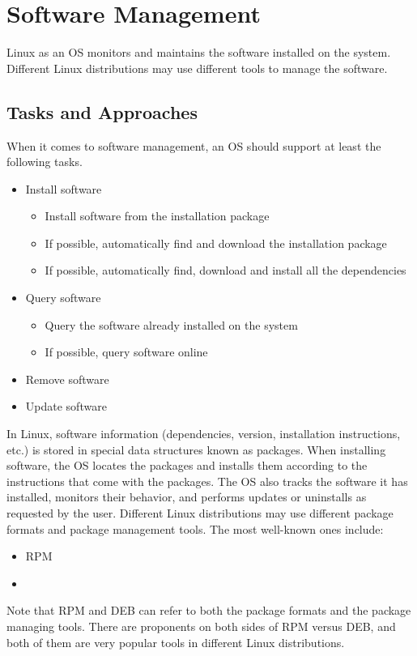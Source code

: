 \chapter{Software Management} \label{ch:software-management}

Linux as an OS monitors and maintains the software installed on the system. Different Linux distributions may use different tools to manage the software.

\section{Tasks and Approaches}

When it comes to software management, an OS should support at least the following tasks.
\begin{itemize}
	\item Install software
		\begin{itemize}
			\item Install software from the installation package
			\item If possible, automatically find and download the installation package
			\item If possible, automatically find, download and install all the dependencies
		\end{itemize}
	\item Query software
		\begin{itemize}
			\item Query the software already installed on the system
			\item If possible, query software online
		\end{itemize}
	\item Remove software
	\item Update software
\end{itemize}

In Linux, software information (dependencies, version, installation instructions, etc.) is stored in special data structures known as packages. When installing software, the OS locates the packages and installs them according to the instructions that come with the packages. The OS also tracks the software it has installed, monitors their behavior, and performs updates or uninstalls as requested by the user. Different Linux distributions may use different package formats and package management tools. The most well-known ones include:
\begin{itemize}
	\item RPM
	\item {}
\end{itemize}
Note that RPM and DEB can refer to both the package formats and the package managing tools. There are proponents on both sides of RPM versus DEB, and both of them are very popular tools in different Linux distributions.


